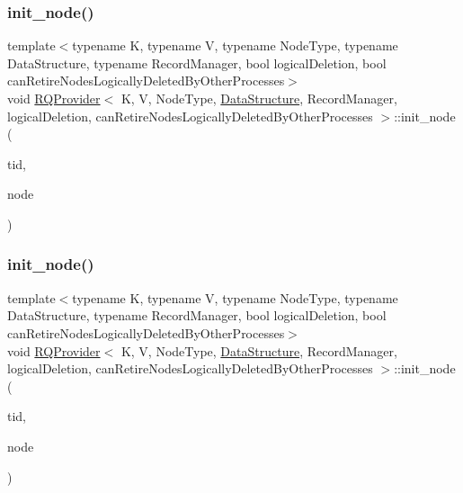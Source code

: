 \mbox{\label{classRQProvider_a2cd517d996a170c029435b638c9cf219}} 
\subsubsection{\texorpdfstring{init\+\_\+node()}{init\_node()}\hspace{0.1cm}{\footnotesize\ttfamily [2/5]}}
{\footnotesize\ttfamily template$<$typename K, typename V, typename Node\+Type, typename Data\+Structure, typename Record\+Manager, bool logical\+Deletion, bool can\+Retire\+Nodes\+Logically\+Deleted\+By\+Other\+Processes$>$ \\
void \hyperlink{classRQProvider}{R\+Q\+Provider}$<$ K, V, Node\+Type, \hyperlink{classDataStructure}{Data\+Structure}, Record\+Manager, logical\+Deletion, can\+Retire\+Nodes\+Logically\+Deleted\+By\+Other\+Processes $>$\+::init\+\_\+node (\begin{DoxyParamCaption}\item[{const int}]{tid,  }\item[{Node\+Type $\ast$const}]{node }\end{DoxyParamCaption})\hspace{0.3cm}{\ttfamily [inline]}}

\mbox{\label{classRQProvider_a2cd517d996a170c029435b638c9cf219}} 
\subsubsection{\texorpdfstring{init\+\_\+node()}{init\_node()}\hspace{0.1cm}{\footnotesize\ttfamily [3/5]}}
{\footnotesize\ttfamily template$<$typename K, typename V, typename Node\+Type, typename Data\+Structure, typename Record\+Manager, bool logical\+Deletion, bool can\+Retire\+Nodes\+Logically\+Deleted\+By\+Other\+Processes$>$ \\
void \hyperlink{classRQProvider}{R\+Q\+Provider}$<$ K, V, Node\+Type, \hyperlink{classDataStructure}{Data\+Structure}, Record\+Manager, logical\+Deletion, can\+Retire\+Nodes\+Logically\+Deleted\+By\+Other\+Processes $>$\+::init\+\_\+node (\begin{DoxyParamCaption}\item[{const int}]{tid,  }\item[{Node\+Type $\ast$const}]{node }\end{DoxyParamCaption})\hspace{0.3cm}{\ttfamily [inline]}}

